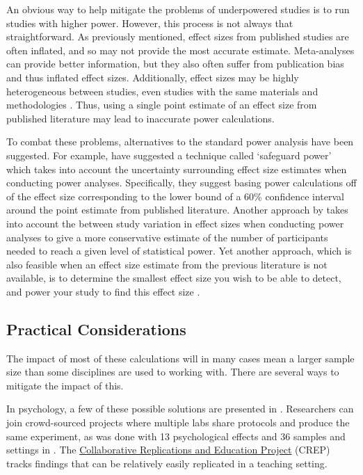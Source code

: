 \documentclass[12pt] {article}
\begin{document}
An obvious way to help mitigate the problems of underpowered studies is to run studies with higher power. However, this 
process is not always that straightforward. As previously mentioned, effect sizes from published studies are often inflated, 
and so may not provide the most accurate estimate. Meta-analyses can provide better information, but they also often suffer 
from publication bias and thus inflated effect sizes. Additionally, effect sizes may be highly heterogeneous between studies, 
even studies with the same materials and methodologies \citep{many_labs}. Thus, using a single point estimate of an effect size 
from published literature may lead to inaccurate power calculations.

To combat these problems, alternatives to the standard power analysis have been suggested. For example, \cite{perugini2014safeguard} 
have suggested a technique called `safeguard power' which takes into account the uncertainty surrounding effect size estimates 
when conducting power analyses. Specifically, they suggest basing power calculations off of the effect size corresponding to the lower bound of a 60\% confidence interval around the point estimate from published literature. Another approach by \cite{mcshane_2014} takes into account the between study variation in effect sizes when conducting power analyses to give a more conservative estimate of the number of participants needed to reach a given level of statistical power. Yet another approach, which is also feasible when an effect size estimate from the previous literature is not available, is to determine the smallest effect size you wish to be able to detect, and power your study to find this effect size \citep{bloom1995minimum}.  

\subsection {Practical Considerations}
The impact of most of these calculations will in many cases mean a larger sample size than some disciplines are used to working with. There are several ways to mitigate the impact of this. 

In psychology, a few of these possible solutions are presented in \cite{openmaximizing}. Researchers can join crowd-sourced projects where multiple labs share protocols and produce the same experiment, as was done with 13 psychological effects and 36 samples and settings in \cite{many_labs}. The \href{https://osf.io/wfc6u/}{Collaborative Replications and Education Project} (CREP) tracks findings that can be relatively easily replicated in a teaching setting. 
\end{document}
